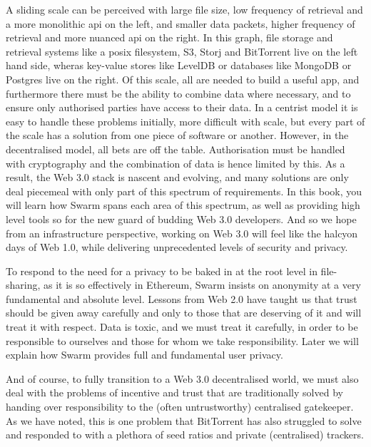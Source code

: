 A sliding scale can be perceived with large file size, low frequency of retrieval and a more monolithic api on the left, and smaller data packets, higher frequency of retrieval and more nuanced api on the right. In this graph, file storage and retrieval systems like a posix filesystem, S3, Storj and BitTorrent live on the left hand side, wheras key-value stores like LevelDB or databases like MongoDB or Postgres live on the right. Of this scale, all are needed to build a useful app, and furthermore there must be the ability to combine data where necessary, and to ensure only authorised parties have access to their data. In a centrist model it is easy to handle these problems initially, more difficult with scale, but every part of the scale has a solution from one piece of software or another. However, in the decentralised model, all bets are off the table. Authorisation must be handled with cryptography and the combination of data is hence limited by this. As a result, the Web 3.0 stack is nascent and evolving, and many solutions are only deal piecemeal with only part of this spectrum of requirements. In this book, you will learn how Swarm spans each area of this spectrum, as well as providing high level tools so for the new guard of budding Web 3.0 developers. And so we hope from an infrastructure perspective, working on Web 3.0 will feel like the halcyon days of Web 1.0, while delivering unprecedented levels of security and privacy.

To respond to the need for a privacy to be baked in at the root level in file-sharing, as it is so effectively in Ethereum, Swarm insists on anonymity at a very fundamental and absolute level. Lessons from Web 2.0 have taught us that trust should be given away carefully and only to those that are deserving of it and will treat it with respect. Data is toxic, and we must treat it carefully, in order to be responsible to ourselves and those for whom we take responsibility. Later we will explain how Swarm provides full and fundamental user privacy.

And of course, to fully transition to a Web 3.0 decentralised world, we must also deal with the problems of incentive and trust that are traditionally solved by handing over responsibility to the (often untrustworthy) centralised gatekeeper. As we have noted, this is one problem that BitTorrent has also struggled to solve and responded to with a plethora of seed ratios and private (centralised) trackers.

